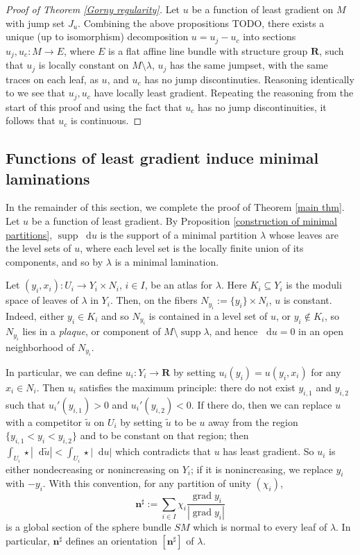\documentclass[reqno,10pt]{amsart}
\newcommand{\RR}{\mathbf{R}}
\DeclareMathOperator{\supp}{supp}
\newcommand*\dif{\mathop{}\!\mathrm{d}}
\DeclareMathOperator{\grad}{grad}
\newcommand{\normal}{\mathbf n}
\newcommand{\dfn}[1]{\emph{#1}\index{#1}}
\theoremstyle{definition}
\numberwithin{equation}{section}
\begin{document}
\begin{proof}[Proof of Theorem \ref{Gorny regularity}]
Let $u$ be a function of least gradient on $M$ with jump set $J_u$.
Combining the above propositions TODO, there exists a unique (up to isomorphism) decomposition $u = u_j - u_c$ into sections $u_j, u_c: M \to E$, where $E$ is a flat affine line bundle with structure group $\RR$, such that $u_j$ is locally constant on $M \setminus \lambda$, $u_j$ has the same jumpset, with the same traces on each leaf, as $u$, and $u_c$ has no jump discontinuties.
Reasoning identically to \cite[pg11]{górny2017planar} we see that $u_j, u_c$ have locally least gradient.
Repeating the reasoning from the start of this proof and using the fact that $u_c$ has no jump discontinuities, it follows that $u_c$ is continuous.
\end{proof}

\subsection{Functions of least gradient induce minimal laminations}
In the remainder of this section, we complete the proof of Theorem \ref{main thm}.
Let $u$ be a function of least gradient.
By Proposition \ref{construction of minimal partitions}, $\supp \dif u$ is the support of a minimal partition $\lambda$ whose leaves are the level sets of $u$, where each level set is the locally finite union of its components, and so by \cite[TODO]{BackusCML} $\lambda$ is a minimal lamination.

Let $(y_i, x_i): U_i \to Y_i \times N_i$, $i \in I$, be an atlas for $\lambda$.
Here $K_i \subseteq Y_i$ is the moduli space of leaves of $\lambda$ in $Y_i$.
Then, on the fibers $N_{y_i} := \{y_i\} \times N_i$, $u$ is constant.
Indeed, either $y_i \in K_i$ and so $N_{y_i}$ is contained in a level set of $u$, or $y_i \notin K_i$, so $N_{y_i}$ lies in a \dfn{plaque}, or component of $M \setminus \supp \lambda$, and hence $\dif u = 0$ in an open neighborhood of $N_{y_i}$.

In particular, we can define $u_i: Y_i \to \RR$ by setting $u_i(y_i) = u(y_i, x_i)$ for any $x_i \in N_i$.
Then $u_i$ satisfies the maximum principle: there do not exist $y_{i,1}$ and $y_{i,2}$ such that $u_i'(y_{i,1}) > 0$ and $u_i'(y_{i,2}) < 0$.
If there do, then we can replace $u$ with a competitor $\tilde u$ on $U_i$ by setting $\tilde u$ to be $u$ away from the region $\{y_{i,1} < y_i < y_{i,2}\}$ and to be constant on that region; then $\int_{U_i} \star |\dif \tilde u| < \int_{U_i} \star |\dif u|$ which contradicts that $u$ has least gradient.
So $u_i$ is either nondecreasing or nonincreasing on $Y_i$; if it is nonincreasing, we replace $y_i$ with $-y_i$.
With this convention, for any partition of unity $(\chi_i)$,
$$\normal^\sharp := \sum_{i \in I} \chi_i \frac{\grad y_i}{|\grad y_i|}$$
is a global section of the sphere bundle $SM$ which is normal to every leaf of $\lambda$. In particular, $\normal^\sharp$ defines an orientation $[\normal^\sharp]$ of $\lambda$.
\end{document}
